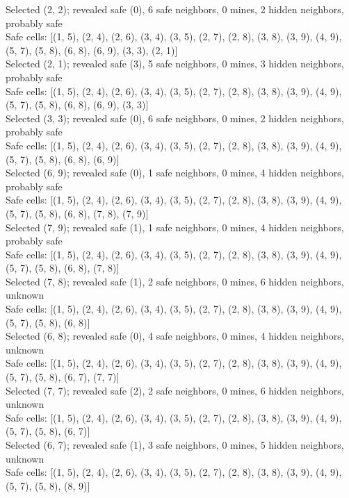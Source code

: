 \documentclass[11pt]{article} %
\begin{document}
Selected (2, 2); revealed safe (0), 6 safe neighbors, 0 mines, 2 hidden neighbors, probably safe\\
Safe cells: [(1, 5), (2, 4), (2, 6), (3, 4), (3, 5), (2, 7), (2, 8), (3, 8), (3, 9), (4, 9), (5, 7), (5, 8), (6, 8), (6, 9), (3, 3), (2, 1)]\\
Selected (2, 1); revealed safe (3), 5 safe neighbors, 0 mines, 3 hidden neighbors, probably safe\\
Safe cells: [(1, 5), (2, 4), (2, 6), (3, 4), (3, 5), (2, 7), (2, 8), (3, 8), (3, 9), (4, 9), (5, 7), (5, 8), (6, 8), (6, 9), (3, 3)]\\
Selected (3, 3); revealed safe (0), 6 safe neighbors, 0 mines, 2 hidden neighbors, probably safe\\
Safe cells: [(1, 5), (2, 4), (2, 6), (3, 4), (3, 5), (2, 7), (2, 8), (3, 8), (3, 9), (4, 9), (5, 7), (5, 8), (6, 8), (6, 9)]\\
Selected (6, 9); revealed safe (0), 1 safe neighbors, 0 mines, 4 hidden neighbors, probably safe\\
Safe cells: [(1, 5), (2, 4), (2, 6), (3, 4), (3, 5), (2, 7), (2, 8), (3, 8), (3, 9), (4, 9), (5, 7), (5, 8), (6, 8), (7, 8), (7, 9)]\\
Selected (7, 9); revealed safe (1), 1 safe neighbors, 0 mines, 4 hidden neighbors, probably safe\\
Safe cells: [(1, 5), (2, 4), (2, 6), (3, 4), (3, 5), (2, 7), (2, 8), (3, 8), (3, 9), (4, 9), (5, 7), (5, 8), (6, 8), (7, 8)]\\
Selected (7, 8); revealed safe (1), 2 safe neighbors, 0 mines, 6 hidden neighbors, unknown\\
Safe cells: [(1, 5), (2, 4), (2, 6), (3, 4), (3, 5), (2, 7), (2, 8), (3, 8), (3, 9), (4, 9), (5, 7), (5, 8), (6, 8)]\\
Selected (6, 8); revealed safe (0), 4 safe neighbors, 0 mines, 4 hidden neighbors, unknown\\
Safe cells: [(1, 5), (2, 4), (2, 6), (3, 4), (3, 5), (2, 7), (2, 8), (3, 8), (3, 9), (4, 9), (5, 7), (5, 8), (6, 7), (7, 7)]\\
Selected (7, 7); revealed safe (2), 2 safe neighbors, 0 mines, 6 hidden neighbors, unknown\\
Safe cells: [(1, 5), (2, 4), (2, 6), (3, 4), (3, 5), (2, 7), (2, 8), (3, 8), (3, 9), (4, 9), (5, 7), (5, 8), (6, 7)]\\
Selected (6, 7); revealed safe (1), 3 safe neighbors, 0 mines, 5 hidden neighbors, unknown\\
Safe cells: [(1, 5), (2, 4), (2, 6), (3, 4), (3, 5), (2, 7), (2, 8), (3, 8), (3, 9), (4, 9), (5, 7), (5, 8), (8, 9)]\\
\end{document}
